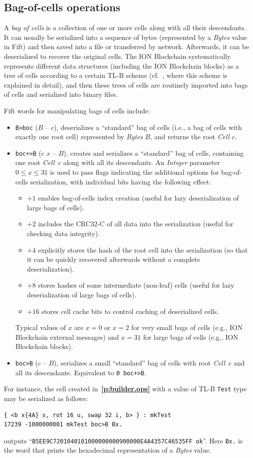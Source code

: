 \documentclass[12pt,oneside]{article}
\def\refpoint#1{{\rm\textbf{\ref{#1}}}}
\let\ptref=\refpoint
\def\mysubsection#1{\subsection{#1}\fancyhead[C]{\small{\textsc{\textrm{\thesubsection.} #1}}}}
\begin{document}
\mysubsection{Bag-of-cells operations}\label{p:boc.ops}
A {\em bag of cells\/} is a collection of one or more cells along with all their descendants. It can usually be serialized into a sequence of bytes (represented by a {\em Bytes\/} value in Fift) and then saved into a file or transferred by network. Afterwards, it can be deserialized to recover the original cells. The ION Blockchain systematically represents different data structures (including the ION Blockchain blocks) as a tree of cells according to a certain TL-B scheme (cf.~\cite{TBC}, where this scheme is explained in detail), and then these trees of cells are routinely imported into bags of cells and serialized into binary files.

Fift words for manipulating bags of cells include:
\begin{itemize}
\item {\tt B>boc} ($B$ -- $c$), deserializes a ``standard'' bag of cells (i.e., a bag of cells with exactly one root cell) represented by {\em Bytes} $B$, and returns the root {\em Cell\/} $c$.
\item {\tt boc+>B} ($c$ $x$ -- $B$), creates and serializes a ``standard'' bag of cells, containing one root {\em Cell\/}~$c$ along with all its descendants. An {\em Integer\/} parameter $0\leq x\leq 31$ is used to pass flags indicating the additional options for bag-of-cells serialization, with individual bits having the following effect:
  \begin{itemize}
  \item $+1$ enables bag-of-cells index creation (useful for lazy deserialization of large bags of cells).
  \item $+2$ includes the CRC32-C of all data into the serialization (useful for checking data integrity).
  \item $+4$ explicitly stores the hash of the root cell into the serialization (so that it can be quickly recovered afterwards without a complete deserialization).
  \item $+8$ stores hashes of some intermediate (non-leaf) cells (useful for lazy deserialization of large bags of cells).
  \item $+16$ stores cell cache bits to control caching of deserialized cells.
  \end{itemize}
Typical values of $x$ are $x=0$ or $x=2$ for very small bags of cells (e.g., ION Blockchain external messages) and $x=31$ for large bags of cells (e.g., ION Blockchain blocks).
\item {\tt boc>B} ($c$ -- $B$), serializes a small ``standard'' bag of cells with root {\em Cell\/}~$c$ and all its descendants. Equivalent to {\tt 0 boc+>B}.
\end{itemize}
For instance, the cell created in~\ptref{p:builder.ops} with a value of TL-B {\tt Test} type may be serialized as follows:
\begin{verbatim}
{ <b x{4A} s, rot 16 u, swap 32 i, b> } : mkTest
17239 -1000000001 mkTest boc>B Bx.
\end{verbatim}
outputs ``{\tt B5EE9C7201040101000000000900000E4A4357C46535FF ok}''. Here {\tt Bx.} is the word that prints the hexadecimal representation of a {\em Bytes} value.
\end{document}
